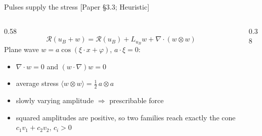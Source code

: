 \documentclass[aspectratio=169,11pt]{beamer}
\newcommand{\Res}{\mathcal{R}}
\newcommand{\src}[1]{{\scriptsize\color{accent}\textsf{[#1]}}}
\begin{document}
\begin{frame}{Pulses supply the stress \src{Paper \S3.3; Heuristic}}
\begin{columns}[c]
\begin{column}{0.58\textwidth}
\[
\Res(u_B+w)=\Res(u_B)+L_{u_B}w+\nabla\cdot(w\otimes w)
\]
Plane wave $w=a\cos(\xi\cdot x+\varphi)$, $a\cdot\xi=0$:
\begin{itemize}\small
\item $\nabla\cdot w=0$ and $(w\cdot\nabla)w=0$
\item average stress $\langle w\otimes w\rangle=\tfrac12\,a\otimes a$
\item slowly varying amplitude $\Rightarrow$ prescribable force
\item squared amplitudes are positive, so two families reach exactly the cone $c_1v_1+c_2v_2$, $c_i>0$
\end{itemize}
\end{column}
\begin{column}{0.38\textwidth}
\end{column}
\end{columns}
\end{frame}
\end{document}

